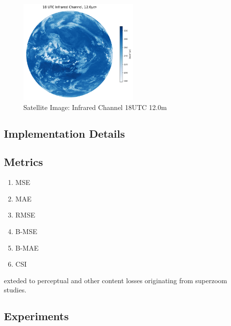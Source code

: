 \documentclass[acmtog, authorversion]{acmart}
\begin{document}
\begin{figure}
    \centering
    \includegraphics[width=225]{report/images/infrared.png}
    \caption{Satellite Image: Infrared Channel 18UTC 12.0\mu m}
    \label{fig:my_label}
\end{figure}

\subsection{Implementation Details}

\subsection{Metrics}

\begin{enumerate}
    \item MSE
    \item MAE
    \item RMSE
    \item B-MSE
    \item B-MAE
    \item CSI
\end{enumerate}

exteded to perceptual and other content losses originating from superzoom studies.

\subsection{Experiments}
\end{document}
